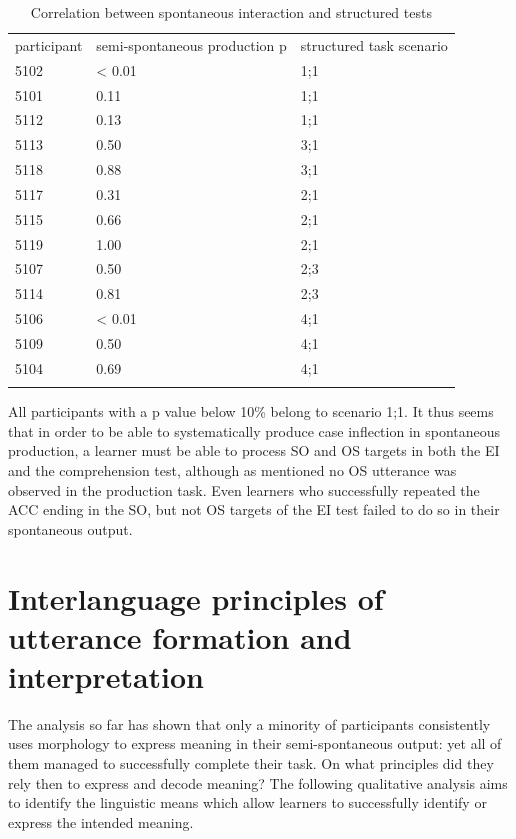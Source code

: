 \begin{table}
    \begin{tabularx}{\textwidth}{XXX}
        \lsptoprule
         participant & semi-spontaneous production p & structured task scenario\\
         5102 & < 0.01 & 1;1\\
         5101 & 0.11 & 1;1\\
         5112 & 0.13 & 1;1\\
         5113 & 0.50 & 3;1\\
         5118 & 0.88 & 3;1\\
         5117 & 0.31 & 2;1\\
         5115 & 0.66 & 2;1\\
         5119 & 1.00 & 2;1\\
         5107 & 0.50 & 2;3\\
         5114 & 0.81 & 2;3\\
         5106 & < 0.01 & 4;1\\
         5109 & 0.50 & 4;1\\
         5104 & 0.69 & 4;1\\
        \lspbottomrule
    \end{tabularx}
    \caption{Correlation between spontaneous interaction and structured tests}
    \label{tab:07:6}
\end{table}

All participants with a p value below 10\% belong to scenario 1;1. It thus seems that in order to be able to systematically produce case inflection in spontaneous production, a learner must be able to process SO and OS targets in both the EI and the comprehension test, although as mentioned no OS utterance was observed in the production task. Even learners who successfully repeated the ACC ending in the SO, but not OS targets of the EI test failed to do so in their spontaneous output.

\section{Interlanguage principles of utterance formation and interpretation}\label{sec:07:5}

The analysis so far has shown that only a minority of participants consistently uses morphology to express meaning in their semi-spontaneous output: yet all of them managed to successfully complete their task. On what principles did they rely then to express and decode meaning? The following qualitative analysis aims to identify the linguistic means which allow learners to successfully identify or express the intended meaning.

